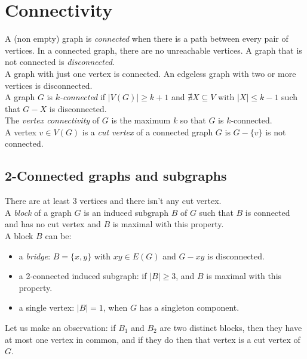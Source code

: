 \chapter{Connectivity}
	A (non empty) graph is \textit{connected} when there is a path between every pair of vertices. In a connected graph, there are no unreachable vertices. A graph that is not connected is \textit{disconnected}.\\

	A graph with just one vertex is connected. An edgeless graph with two or more vertices is disconnected.\\
	
	A graph $G$ is \textit{$k$-connected} if $|V(G)| \geq k + 1$ and $\nexists X \subseteq V$ with $|X| \leq k-1$ such that $G-X$ is disconnected.\\
	
	The \textit{vertex connectivity} of $G$ is the maximum $k$ so that $G$ is $k$-connected.\\
	
	A vertex $v \in V(G)$ is a \textit{cut vertex} of a connected graph $G$ is $G - \{ v \}$  is not connected.

	\section{2-Connected graphs and subgraphs}
		There are at least 3 vertices and there isn't any cut vertex.\\
		
		A \textit{block} of a graph $G$ is an induced subgraph $B$ of $G$ such that $B$ is connected and has no cut vertex and $B$ is maximal with this property.\\
		
		A block $B$ can be:
			\begin{itemize}
				\item a \textit{bridge}: $B = \{x,y\}$ with $xy \in E(G)$ and $G - xy$ is disconnected.
				\item a 2-connected induced subgraph: if $|B| \geq 3$, and $B$ is maximal with this property.
				\item a single vertex: $|B| = 1$, when $G$ has a singleton component.
			\end{itemize}
			
		Let us make an observation: if $B_1$ and $B_2$ are two distinct blocks, then they have at most one vertex in common, and if they do then that vertex is a cut vertex of $G$.\\
		
